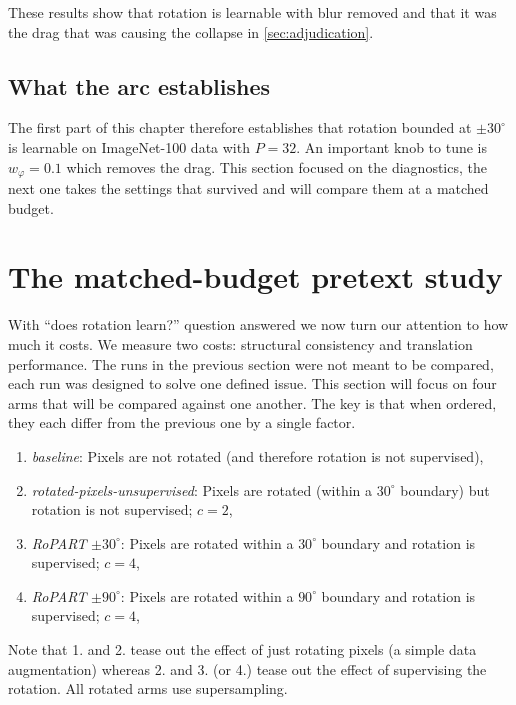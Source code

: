 \documentclass[final_report.tex]{subfiles}
\begin{document}
These results show that rotation is learnable with blur removed and that it was the drag that was causing the collapse in \cref{sec:adjudication}.

\subsection{What the arc establishes}\label{sec:arc-establishes}
The first part of this chapter therefore establishes that rotation bounded at $\pm30^\circ$ is learnable on ImageNet-100 data with $P=32$. An important knob to tune is $w_\varphi=0.1$ which removes the drag. This section focused on the diagnostics, the next one takes the settings that survived and will compare them at a matched budget.

\section{The matched-budget pretext study}\label{sec:matched-budget}

With ``does rotation learn?'' question answered we now turn our attention to how much it costs. We measure two costs: structural consistency and translation performance. The runs in the previous section were not meant to be compared, each run was designed to solve one defined issue. This section will focus on four arms that will be compared against one another. The key is that when ordered, they each differ from the previous one by a single factor.
\begin{enumerate}
\item \emph{baseline}: Pixels are not rotated (and therefore rotation is not supervised),
\item \emph{rotated-pixels-unsupervised}: Pixels are rotated (within a $30^\circ$ boundary) but rotation is not supervised; $c=2$,
\item \emph{RoPART} $\pm30^\circ$: Pixels are rotated within a $30^\circ$ boundary and rotation is supervised; $c=4$,
\item \emph{RoPART} $\pm90^\circ$: Pixels are rotated within a $90^\circ$ boundary and rotation is supervised; $c=4$,
\end{enumerate}
Note that 1. and 2. tease out the effect of just rotating pixels (a simple data augmentation) whereas 2. and 3. (or 4.) tease out the effect of supervising the rotation. All rotated arms use supersampling.
\end{document}
